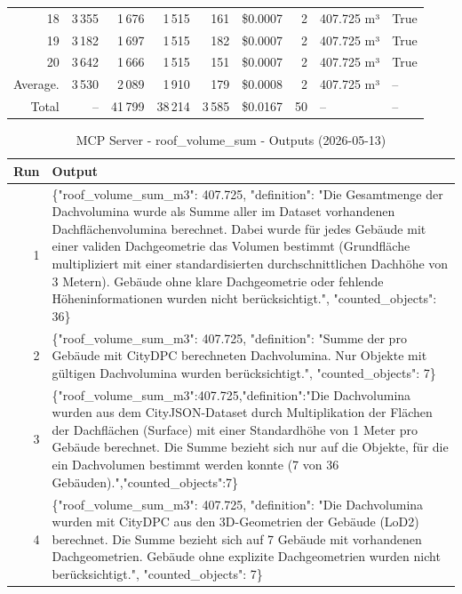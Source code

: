 \documentclass[a4paper,11pt]{article}
\begin{document}
\begin{table}[ht]
\begin{tabular}{r r r r r r r p{3cm} l}
18 & 3\,355 & 1\,676 & 1\,515 & 161 & \$0.0007 & 2 & 407.725 m³ & True \\
19 & 3\,182 & 1\,697 & 1\,515 & 182 & \$0.0007 & 2 & 407.725 m³ & True \\
20 & 3\,642 & 1\,666 & 1\,515 & 151 & \$0.0007 & 2 & 407.725 m³ & True \\
\hline
Average. & 3\,530 & 2\,089 & 1\,910 & 179 & \$0.0008 & 2 & 407.725 m³ & -- \\
Total & -- & 41\,799 & 38\,214 & 3\,585 & \$0.0167 & 50 & -- & -- \\
\hline
\end{tabular}
\end{table}

\clearpage

\begin{table}[ht]
\centering
\scriptsize
\caption{MCP Server - roof\_volume\_sum - Outputs (2026-05-13)}
\label{tab:mcp\_roof\_volume\_sum\_outputs\_2026-05-13}
\begin{tabular}{r p{12cm}}
\hline
Run & Output \\
\hline
1 & \{"roof\_volume\_sum\_m3": 407.725, "definition": "Die Gesamtmenge der Dachvolumina wurde als Summe aller im Dataset vorhandenen Dachflächenvolumina berechnet. Dabei wurde für jedes Gebäude mit einer validen Dachgeometrie das Volumen bestimmt (Grundfläche multipliziert mit einer standardisierten durchschnittlichen Dachhöhe von 3 Metern). Gebäude ohne klare Dachgeometrie oder fehlende Höheninformationen wurden nicht berücksichtigt.", "counted\_objects": 36\} \\
2 & \{"roof\_volume\_sum\_m3": 407.725, "definition": "Summe der pro Gebäude mit CityDPC berechneten Dachvolumina. Nur Objekte mit gültigen Dachvolumina wurden berücksichtigt.", "counted\_objects": 7\} \\
3 & \{"roof\_volume\_sum\_m3":407.725,"definition":"Die Dachvolumina wurden aus dem CityJSON-Dataset durch Multiplikation der Flächen der Dachflächen (Surface) mit einer Standardhöhe von 1 Meter pro Gebäude berechnet. Die Summe bezieht sich nur auf die Objekte, für die ein Dachvolumen bestimmt werden konnte (7 von 36 Gebäuden).","counted\_objects":7\} \\
4 & \{"roof\_volume\_sum\_m3": 407.725, "definition": "Die Dachvolumina wurden mit CityDPC aus den 3D-Geometrien der Gebäude (LoD2) berechnet. Die Summe bezieht sich auf 7 Gebäude mit vorhandenen Dachgeometrien. Gebäude ohne explizite Dachgeometrien wurden nicht berücksichtigt.", "counted\_objects": 7\} \\

\end{tabular}
\end{table}
\end{document}
